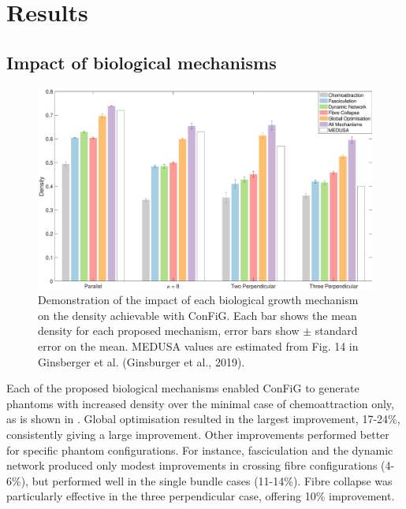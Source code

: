 \section{Results}
\label{sec:config_results}

\subsection{Impact of biological mechanisms}
\label{sec:config_result_impact_of_mechanisms}

\begin{figure}
  \centering
  \includegraphics[width=\textwidth]{figures/config/improvements_wfascicle_tight.eps}
  \caption[Impact of biological mechanisms in \ac{ConFiG}]{Demonstration of the impact of each biological growth mechanism on the density achievable with \ac{ConFiG}. Each bar shows the mean density for each proposed mechanism, error bars show $\pm$ standard error on the mean. MEDUSA values are estimated from Fig. 14 in Ginsberger et al. (Ginsburger et al., 2019).}
  \label{fig:config_res_improvements}
\end{figure}

Each of the proposed biological mechanisms enabled \ac{ConFiG} to generate phantoms with increased density over the minimal case of chemoattraction only, as is shown in . Global optimisation resulted in the largest improvement, 17-24\%, consistently giving a large improvement. Other improvements performed better for specific phantom configurations. For instance, fasciculation and the dynamic network produced only modest improvements in crossing fibre configurations (4-6\%), but performed well in the single bundle cases (11-14\%). Fibre collapse was particularly effective in the three perpendicular case, offering 10\% improvement.

